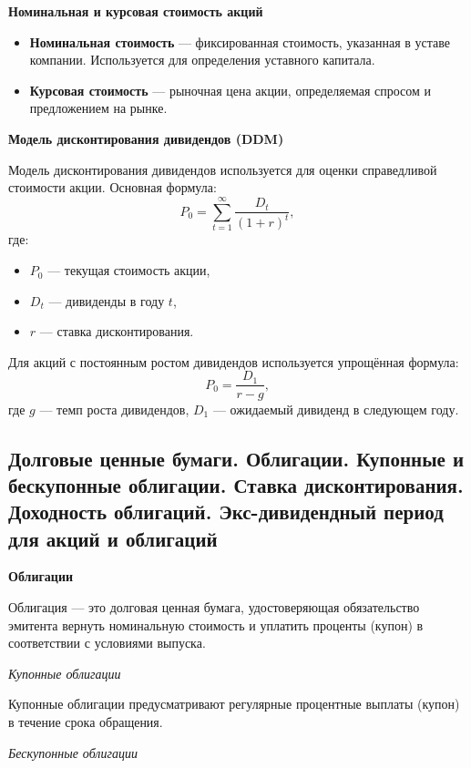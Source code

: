 \textbf{Номинальная и курсовая стоимость акций}
\begin{itemize}
    \item \textbf{Номинальная стоимость} --- фиксированная стоимость, указанная в уставе компании. Используется для определения уставного капитала.
    \item \textbf{Курсовая стоимость} --- рыночная цена акции, определяемая спросом и предложением на рынке.
\end{itemize}

\textbf{Модель дисконтирования дивидендов (DDM)}

Модель дисконтирования дивидендов используется для оценки справедливой стоимости акции. Основная формула:
\begin{equation}
    P_0 = \sum_{t=1}^{\infty} \frac{D_t}{(1 + r)^t},
\end{equation}
\noindent где:
\begin{itemize}
    \item $P_0$ --- текущая стоимость акции,
    \item $D_t$ --- дивиденды в году $t$,
    \item $r$ --- ставка дисконтирования.
\end{itemize}

Для акций с постоянным ростом дивидендов используется упрощённая формула:
\begin{equation}
    P_0 = \frac{D_1}{r - g},
\end{equation}
\noindent где $g$ --- темп роста дивидендов, $D_1$ --- ожидаемый дивиденд в следующем году.


\pagebreak
\subsection{Долговые ценные бумаги. Облигации. Купонные и бескупонные облигации. Ставка дисконтирования. Доходность облигаций. Экс-дивидендный период для акций и облигаций}

\textbf{Облигации}

Облигация --- это долговая ценная бумага, удостоверяющая обязательство эмитента вернуть номинальную стоимость и уплатить проценты (купон) в соответствии с условиями выпуска.

\textit{Купонные облигации}

Купонные облигации предусматривают регулярные процентные выплаты (купон) в течение срока обращения.

\textit{Бескупонные облигации}

